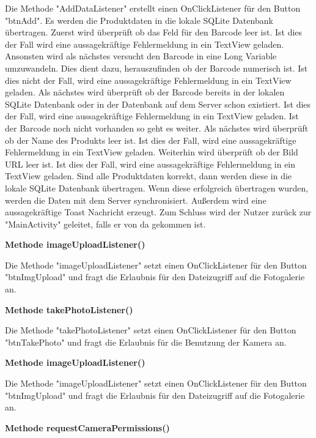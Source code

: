 \documentclass{scrartcl}
\begin{document}
\noindent Die Methode "AddDataListener" erstellt einen OnClickListener für den Button "btnAdd". Es werden die Produktdaten in die lokale SQLite Datenbank übertragen. Zuerst wird überprüft ob das Feld für den Barcode leer ist. Ist dies der Fall wird eine aussagekräftige Fehlermeldung in ein TextView geladen. Ansonsten wird als nächstes versucht den Barcode in eine Long Variable umzuwandeln. Dies dient dazu, herauszufinden ob der Barcode numerisch ist. Ist dies nicht der Fall, wird eine aussagekräftige Fehlermeldung in ein TextView geladen. Als nächstes wird überprüft ob der Barcode bereits in der lokalen SQLite Datenbank oder in der Datenbank auf dem Server schon existiert. Ist dies der Fall, wird eine aussagekräftige Fehlermeldung in ein TextView geladen. Ist der Barcode noch nicht vorhanden so geht es weiter. Als nächstes wird überprüft ob der Name des Produkts leer ist. Ist dies der Fall, wird eine aussagekräftige Fehlermeldung in ein TextView geladen. Weiterhin wird überprüft ob der Bild URL leer ist. Ist dies der Fall, wird eine aussagekräftige Fehlermeldung in ein TextView geladen. Sind alle Produktdaten korrekt, dann werden diese in die lokale SQLite Datenbank übertragen. Wenn diese erfolgreich übertragen wurden, werden die Daten mit dem Server synchronisiert. Außerdem wird eine aussagekräftige Toast Nachricht erzeugt. Zum Schluss wird der Nutzer zurück zur "MainActivity" geleitet, falls er von da gekommen ist.\newline 

\noindent\textbf{Methode imageUploadListener()} 

\noindent Die Methode "imageUploadListener" setzt einen OnClickListener für den Button "btnImgUpload" und fragt die Erlaubnis für den Dateizugriff auf die Fotogalerie an.\newline 

\noindent\textbf{Methode takePhotoListener()} 

\noindent Die Methode "takePhotoListener" setzt einen OnClickListener für den Button "btnTakePhoto" und fragt die Erlaubnis für die Benutzung der Kamera an. \newline

\noindent\textbf{Methode imageUploadListener()} 

\noindent Die Methode "imageUploadListener" setzt einen OnClickListener für den Button "btnImgUpload" und fragt die Erlaubnis für den Dateizugriff auf die Fotogalerie an. \newline

\noindent\textbf{Methode requestCameraPermissions()} 
\end{document}
